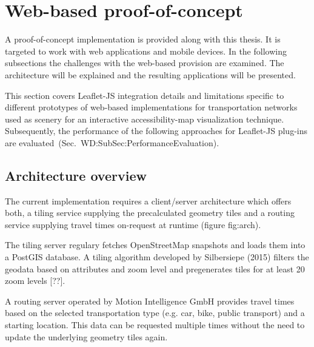 
\cleardoublepage              %
\chapter{Web-based proof-of-concept}
  \label{chap:imple}
  A proof-of-concept implementation is provided along with this thesis. It is targeted to work with web applications and mobile devices. In the following subsections the challenges with the web-based provision are examined. The architecture will be explained and the resulting applications will be presented.\par
  This section covers Leaflet-JS integration details and limitations specific to
  different prototypes of web-based implementations for transportation networks
  used as scenery for an interactive accessibility-map visualization technique.
  Subsequently, the performance of the following approaches for Leaflet-JS plug-ins
  are evaluated~(Sec.~{WD:SubSec:PerformanceEvaluation}).\par
  \section{Architecture overview}
    \label{sec:imple:archi}
    The current implementation requires a client/server architecture which offers both, a tiling service supplying the precalculated geometry tiles and a routing service supplying travel times on-request at runtime (figure {fig:arch}).


    The tiling server regulary fetches OpenStreetMap snapshots and loads them into a PostGIS database. A tiling algorithm developed by Silbersiepe (2015) filters the geodata based on attributes and zoom level and pregenerates tiles for at least 20 zoom levels [??].\par
    A routing server operated by Motion Intelligence GmbH provides travel times based on the selected transportation type (e.g. car, bike, public transport) and a starting location. This data can be requested multiple times without the need to update the underlying geometry tiles again.\par

